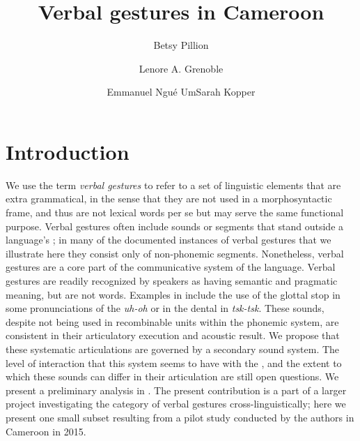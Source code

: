 \documentclass[output=paper
,newtxmath
,modfonts
,nonflat]{langsci/langscibook}
\author{Betsy Pillion\affiliation{University of Chicago}\and Lenore A. Grenoble\affiliation{University of Chicago}\and Emmanuel Ngu{\'e} Um\affiliation{University of Yaound{\'e}}\lastand Sarah Kopper\affiliation{Michigan State University}}
\title{Verbal gestures in Cameroon}
\begin{document}
\maketitle

\section{Introduction}

We use the term \textit{verbal gestures} to refer to a set of linguistic elements that  are extra grammatical, in the sense that they are not used in a morphosyntactic frame, and thus are not lexical words per se but may serve the same functional purpose. Verbal gestures  often include sounds or segments that  stand outside a language's ; in many of the documented instances of verbal gestures that we illustrate here they consist only of non-phonemic segments. Nonetheless, verbal gestures are a core part of the communicative system of the language.  Verbal gestures are readily recognized by speakers as having semantic and pragmatic meaning, but are not words. Examples in  include the use of the glottal stop in some pronunciations of the \textit{uh-oh} or in the dental  in \textit{tsk-tsk}. These sounds, despite not being used in recombinable units within the phonemic system, are consistent in their articulatory execution and acoustic result. We propose that these systematic articulations are governed by a secondary sound system. The level of interaction that this system seems to have with the , and the extent to which these sounds can differ in their articulation are still open questions. We present a preliminary analysis in . The present contribution is a part of a larger project investigating the category of verbal gestures cross-linguistically; here we present one small subset resulting from a pilot study conducted by the authors in Cameroon in 2015.
\end{document}
